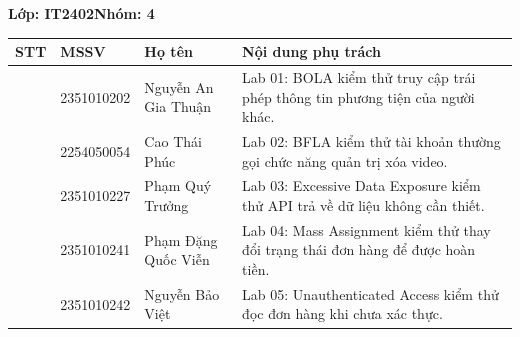 \documentclass[12pt,a4paper]{article}
\begin{document}
\textbf{Lớp: IT2402}\hspace{1.5cm}\textbf{Nhóm: 4}

\vspace{0.4cm}

\begin{tabularx}{\textwidth}{|>{\centering\arraybackslash}p{0.8cm}|p{2.5cm}|p{4.2cm}|X|}
\hline
\textbf{STT} & \textbf{MSSV} & \textbf{Họ tên} & \textbf{Nội dung phụ trách} \\
\hline
1 & 2351010202 & Nguyễn An Gia Thuận & Lab 01: BOLA \textendash{} kiểm thử truy cập trái phép thông tin phương tiện của người khác. \\
\hline
2 & 2254050054 & Cao Thái Phúc & Lab 02: BFLA \textendash{} kiểm thử tài khoản thường gọi chức năng quản trị xóa video. \\
\hline
3 & 2351010227 & Phạm Quý Trưởng & Lab 03: Excessive Data Exposure \textendash{} kiểm thử API trả về dữ liệu không cần thiết. \\
\hline
4 & 2351010241 & Phạm Đặng Quốc Viễn & Lab 04: Mass Assignment \textendash{} kiểm thử thay đổi trạng thái đơn hàng để được hoàn tiền. \\
\hline
5 & 2351010242 & Nguyễn Bảo Việt & Lab 05: Unauthenticated Access \textendash{} kiểm thử đọc đơn hàng khi chưa xác thực. \\
\hline
\end{tabularx}
\end{document}
